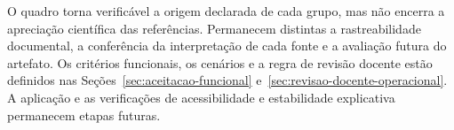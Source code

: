 O quadro torna verificável a origem declarada de cada grupo, mas não encerra a apreciação científica das referências. Permanecem distintas a rastreabilidade documental, a conferência da interpretação de cada fonte e a avaliação futura do artefato. Os critérios funcionais, os cenários e a regra de revisão docente estão definidos nas Seções~\ref{sec:aceitacao-funcional} e~\ref{sec:revisao-docente-operacional}. A aplicação e as verificações de acessibilidade e estabilidade explicativa permanecem etapas futuras.

